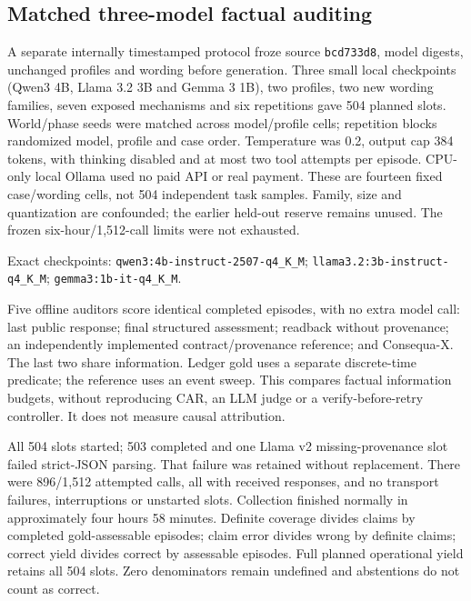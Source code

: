 \documentclass[conference]{IEEEtran}
\begin{document}
\subsection{Matched three-model factual auditing}
A separate internally timestamped protocol froze source \texttt{bcd733d8},
model digests, unchanged profiles and wording before generation. Three small
local checkpoints (Qwen3 4B, Llama 3.2 3B and Gemma 3 1B), two profiles,
two new wording families,
seven exposed mechanisms and six repetitions gave 504 planned slots.
World/phase seeds were matched across model/profile cells; repetition blocks
randomized model, profile and case order. Temperature was 0.2, output cap 384
tokens, with thinking disabled and at most two tool attempts per episode.
CPU-only local Ollama used no paid API or real payment. These are fourteen
fixed case/wording cells, not 504 independent task samples. Family, size and
quantization are confounded; the earlier held-out reserve remains unused.
The frozen six-hour/1,512-call limits were not exhausted.

\begingroup\raggedright\footnotesize
Exact checkpoints: \nolinkurl{qwen3:4b-instruct-2507-q4_K_M};
\nolinkurl{llama3.2:3b-instruct-q4_K_M};
\nolinkurl{gemma3:1b-it-q4_K_M}.\par\endgroup

Five offline auditors score identical completed episodes, with no extra model
call: last public response; final structured assessment; readback without
provenance; an independently implemented contract/provenance reference; and
Consequa-X. The last two share information. Ledger gold uses a separate
discrete-time predicate; the reference uses an event sweep. This compares
factual information budgets, without reproducing CAR, an LLM judge or a
verify-before-retry controller. It does not measure causal attribution.

All 504 slots started; 503 completed and one Llama v2 missing-provenance slot
failed strict-JSON parsing. That failure was retained without replacement.
There were 896/1,512 attempted calls, all with received responses, and no
transport failures, interruptions or unstarted slots. Collection finished
normally in approximately four hours 58 minutes. Definite coverage divides
claims by completed gold-assessable episodes; claim error divides wrong by
definite claims; correct yield divides correct by assessable episodes. Full
planned operational yield retains all 504 slots. Zero denominators remain
undefined and abstentions do not count as correct.
\end{document}
